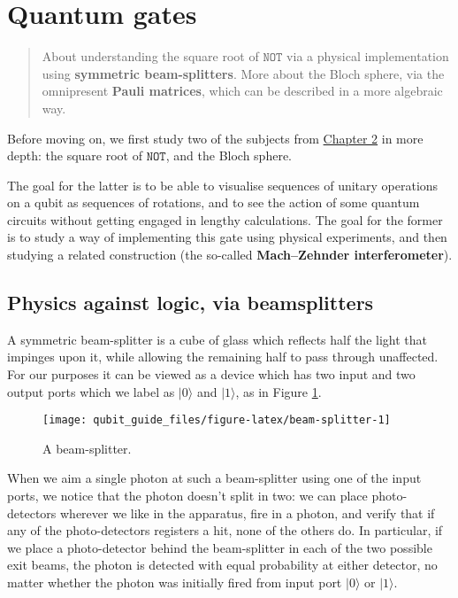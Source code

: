 \documentclass[fleqn]{article}
\let\oldsection\section
\renewcommand\section{\clearpage\oldsection}
\begin{document}
\hypertarget{quantum-gates}{%
\section{Quantum gates}\label{quantum-gates}}

\begin{quote}
About understanding the square root of \(\texttt{NOT}\) via a physical implementation using \textbf{symmetric beam-splitters}.
More about the Bloch sphere, via the omnipresent \textbf{Pauli matrices}, which can be described in a more algebraic way.
\end{quote}

Before moving on, we first study two of the subjects from \protect\hyperlink{qubits}{Chapter 2} in more depth: the square root of \(\texttt{NOT}\), and the Bloch sphere.

The goal for the latter is to be able to visualise sequences of unitary operations on a qubit as sequences of rotations, and to see the action of some quantum circuits without getting engaged in lengthy calculations.
The goal for the former is to study a way of implementing this gate using physical experiments, and then studying a related construction (the so-called \textbf{Mach--Zehnder interferometer}).

\hypertarget{beamsplitters-against-logic}{%
\subsection{Physics against logic, via beamsplitters}\label{beamsplitters-against-logic}}

A symmetric beam-splitter is a cube of glass which reflects half the light that impinges upon it, while allowing the remaining half to pass through unaffected.
For our purposes it can be viewed as a device which has two input and two output ports which we label as \(|0\rangle\) and \(|1\rangle\), as in Figure \ref{fig:beam-splitter}.

\begin{figure}[H]

{\centering \texttt{[image: qubit\_guide\_files/figure-latex/beam-splitter-1]} 

}

\caption{A beam-splitter.}\label{fig:beam-splitter}
\end{figure}

When we aim a single photon at such a beam-splitter using one of the input ports, we notice that the photon doesn't split in two: we can place photo-detectors wherever we like in the apparatus, fire in a photon, and verify that if any of the photo-detectors registers a hit, none of the others do.
In particular, if we place a photo-detector behind the beam-splitter in each of the two possible exit beams, the photon is detected with equal probability at either detector, no matter whether the photon was initially fired from input port \(|0\rangle\) or \(|1\rangle\).
\end{document}
